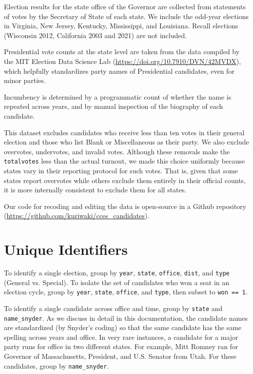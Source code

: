 \documentclass[12pt]{article}
\begin{document}
Election results for the state office of the Governor are collected from statements of votes by the Secretary of State of each state. We include the odd-year elections in Virginia, New Jersey, Kentucky, Mississippi, and Louisiana.
Recall elections (Wisconsin 2012, California 2003 and 2021) are not included.

Presidential vote counts at the state level are taken from the data compiled by the MIT Election Data Science Lab (\url{https://doi.org/10.7910/DVN/42MVDX}), which helpfully standardizes party names of Presidential candidates, even for minor parties.

Incumbency is determined by a programmatic count of whether the name is repeated across years, and by manual inspection of the biography of each candidate.

This dataset excludes candidates who receive less than ten votes in their general election and those who list Blank or Miscellaneous as their party.
We also exclude overvotes, undervotes, and invalid votes.
Although these removals make the \texttt{totalvotes} less than the actual turnout, we made this choice uniformly because states vary in their reporting protocol for such votes. That is, given that some states report overvotes while others exclude them entirely in their official counts, it is more internally consistent to exclude them for all states.

Our code for recoding and editing the data is open-source in a Github repository (\url{https://github.com/kuriwaki/cces_candidates}).


\section{Unique Identifiers}

To identify a single election, group by \texttt{year}, \texttt{state}, \texttt{office}, \texttt{dist}, and \texttt{type} (General vs. Special).  To isolate the set of candidates who won a seat in an election cycle, group by \texttt{year}, \texttt{state}, \texttt{office}, and \texttt{type}, then subset to \texttt{won == 1}.

To identify a single candidate across office and time, group by \texttt{state} and  \texttt{name\_snyder}.
As we discuss in detail in this documentation, the candidate names are standardized (by Snyder's coding) so that the same candidate has the same spelling across years and office.
In very rare instances, a candidate for a major party runs for office in two different states. For example, Mitt Romney ran for Governor of Massachusetts, President, and U.S. Senator from Utah. For these candidates, group by \texttt{name\_snyder}.
\end{document}
